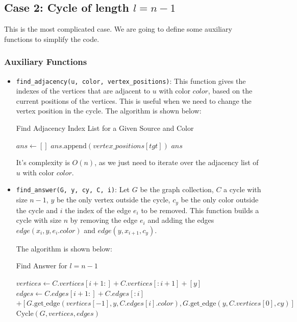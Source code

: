 \subsection{Case 2: Cycle of length \( l = n - 1 \)}

This is the most complicated case. We are going to define some auxiliary functions
to simplify the code.

\subsubsection{Auxiliary Functions}

\begin{itemize}
    \item \texttt{find\_adjacency(u, color, vertex\_positions)}: This function gives the indexes of the 
    vertices that are adjacent to $u$ with color $color$, based on the current 
    positions of the vertices. This is useful when we need to change the vertex position in the cycle.
    The algorithm is shown below:

    \begin{algorithm}
        \caption{Find Adjacency Index List for a Given Source and Color}
        \begin{algorithmic}[1]
                \State $ans \gets []$
                    \State $ans.\text{append}(vertex\_positions[tgt])$
                \EndFor
                \State \Return $ans$ 
            \EndFunction
        \end{algorithmic}
    \end{algorithm}

    It's complexity is $O(n)$, as we just need to iterate over the adjacency list of $u$ with color $color$.

    \item \texttt{find\_answer(G, y, cy, C, i)}: Let $G$ be the graph collection, $C$ a cycle with
    size $n-1$, $y$ be the only vertex outside the cycle, $c_y$ be the only color
    outside the cycle and $i$ the index of the edge $e_i$ to be removed. This function 
    builds a cycle with size $n$ by removing the edge $e_i$ and adding the edges
    $edge(x_{i}, y, e_i.color)$ and $edge(y, x_{i+1}, c_y)$.

    The algorithm is shown below:

    \begin{algorithm}
        \caption{Find Answer for \( l = n - 1 \)}
        \begin{algorithmic}[1]
                \State $vertices \gets C.vertices[i + 1:] + C.vertices[:i + 1] + [y]$
                \State $edges \gets C.edges[i + 1:] + C.edges[:i]$
                \State \hspace{2.5em} $+ [G.\text{get\_edge}(vertices[-1], y, C.edges[i].color), G.\text{get\_edge}(y, C.vertices[0], cy)]$
                \State \Return $\text{Cycle}(G, vertices, edges)$
            \EndFunction
        \end{algorithmic}
    \end{algorithm}


\end{itemize}
